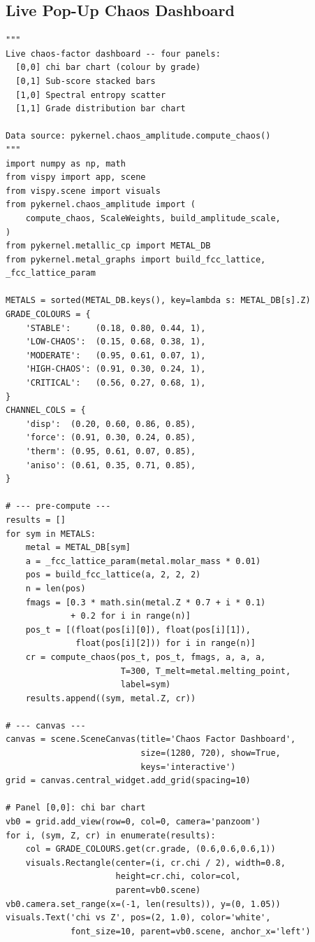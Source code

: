 \documentclass[11pt,a4paper]{article}
\begin{document}
\subsection{Live Pop-Up Chaos Dashboard}

\begin{lstlisting}[title={\textbf{Live VisPy four-panel chaos factor dashboard}}]
"""
Live chaos-factor dashboard -- four panels:
  [0,0] chi bar chart (colour by grade)
  [0,1] Sub-score stacked bars
  [1,0] Spectral entropy scatter
  [1,1] Grade distribution bar chart

Data source: pykernel.chaos_amplitude.compute_chaos()
"""
import numpy as np, math
from vispy import app, scene
from vispy.scene import visuals
from pykernel.chaos_amplitude import (
    compute_chaos, ScaleWeights, build_amplitude_scale,
)
from pykernel.metallic_cp import METAL_DB
from pykernel.metal_graphs import build_fcc_lattice, _fcc_lattice_param

METALS = sorted(METAL_DB.keys(), key=lambda s: METAL_DB[s].Z)
GRADE_COLOURS = {
    'STABLE':     (0.18, 0.80, 0.44, 1),
    'LOW-CHAOS':  (0.15, 0.68, 0.38, 1),
    'MODERATE':   (0.95, 0.61, 0.07, 1),
    'HIGH-CHAOS': (0.91, 0.30, 0.24, 1),
    'CRITICAL':   (0.56, 0.27, 0.68, 1),
}
CHANNEL_COLS = {
    'disp':  (0.20, 0.60, 0.86, 0.85),
    'force': (0.91, 0.30, 0.24, 0.85),
    'therm': (0.95, 0.61, 0.07, 0.85),
    'aniso': (0.61, 0.35, 0.71, 0.85),
}

# --- pre-compute ---
results = []
for sym in METALS:
    metal = METAL_DB[sym]
    a = _fcc_lattice_param(metal.molar_mass * 0.01)
    pos = build_fcc_lattice(a, 2, 2, 2)
    n = len(pos)
    fmags = [0.3 * math.sin(metal.Z * 0.7 + i * 0.1)
             + 0.2 for i in range(n)]
    pos_t = [(float(pos[i][0]), float(pos[i][1]),
              float(pos[i][2])) for i in range(n)]
    cr = compute_chaos(pos_t, pos_t, fmags, a, a, a,
                       T=300, T_melt=metal.melting_point,
                       label=sym)
    results.append((sym, metal.Z, cr))

# --- canvas ---
canvas = scene.SceneCanvas(title='Chaos Factor Dashboard',
                           size=(1280, 720), show=True,
                           keys='interactive')
grid = canvas.central_widget.add_grid(spacing=10)

# Panel [0,0]: chi bar chart
vb0 = grid.add_view(row=0, col=0, camera='panzoom')
for i, (sym, Z, cr) in enumerate(results):
    col = GRADE_COLOURS.get(cr.grade, (0.6,0.6,0.6,1))
    visuals.Rectangle(center=(i, cr.chi / 2), width=0.8,
                      height=cr.chi, color=col,
                      parent=vb0.scene)
vb0.camera.set_range(x=(-1, len(results)), y=(0, 1.05))
visuals.Text('chi vs Z', pos=(2, 1.0), color='white',
             font_size=10, parent=vb0.scene, anchor_x='left')


\end{lstlisting}
\end{document}
